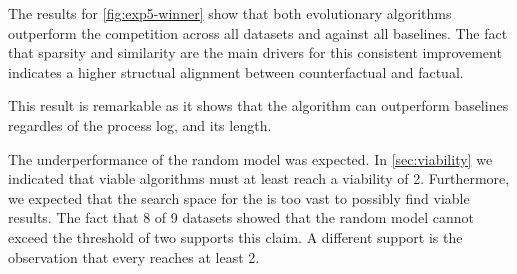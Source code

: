 \documentclass[./../../paper.tex]{subfiles}
\begin{document}
The results for \autoref{fig:exp5-winner} show that both evolutionary algorithms outperform the competition across all datasets and against all baselines. The fact that sparsity and similarity are the main drivers for this consistent improvement indicates a higher structual alignment between counterfactual and factual. 

This result is remarkable as it shows that the algorithm can outperform baselines regardles of the process log, and its length.

The underperformance of the random model was expected. In \autoref{sec:viability} we indicated that viable algorithms must at least reach a viability of 2. 
Furthermore, we expected that the search space for the \ModelRNG is too vast to possibly find viable results. 
The fact that 8 of 9 datasets showed that the random model cannot exceed the threshold of two supports this claim. A different support is the observation that every \ModelCBG reaches at least 2.

\end{document}

